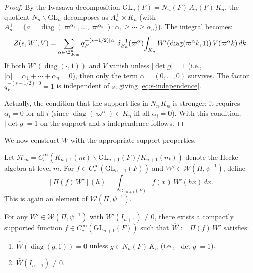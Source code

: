 \begin{proof}
By the Iwasawa decomposition $\mathrm{GL}_n(F) = N_n(F)\,A_n(F)\,K_n$, the
quotient $N_n \backslash \mathrm{GL}_n$ decomposes as $A_n^+ \times K_n$
(with $A_n^+ = \{a = \operatorname{diag}(\varpi^{\alpha_1},\ldots,\varpi^{\alpha_n})
: \alpha_1 \geq \cdots \geq \alpha_n\}$). The integral becomes:
\[
  Z(s, W', V) = \sum_{\alpha \in \Z^n_{\mathrm{dom}}}
  q_F^{-(s-1/2)|\alpha|}\,\delta_{B_n}^{-1}(\varpi^\alpha)\!
  \int_{K_n} W'(\operatorname{diag}(\varpi^\alpha k, 1))\,V(\varpi^\alpha k)\,dk.
\]
If both $W'(\operatorname{diag}(\cdot,1))$ and $V$ vanish unless $|\!\det g| = 1$
(i.e., $|\alpha| = \alpha_1 + \cdots + \alpha_n = 0$), then only the term
$\alpha = (0,\ldots,0)$ survives. The factor $q_F^{-(s-1/2) \cdot 0} = 1$
is independent of $s$, giving \eqref{eq:s-independence}.

Actually, the condition that the support lies in $N_n\,K_n$ is stronger:
it requires $\alpha_i = 0$ for all $i$ (since $\operatorname{diag}(\varpi^\alpha) \in K_n$
iff all $\alpha_i = 0$). With this condition, $|\!\det g| = 1$ on the support
and $s$-independence follows.
\end{proof}

We now construct $W$ with the appropriate support properties.

\begin{definition}\label{def:hecke}
Let $\mathcal{H}_m = C_c^\infty(K_{n+1}(m) \backslash \mathrm{GL}_{n+1}(F) / K_{n+1}(m))$
denote the Hecke algebra at level $m$. For $f \in C_c^\infty(\mathrm{GL}_{n+1}(F))$
and $W' \in \mathcal{W}(\Pi, \psi^{-1})$, define
\[
  [\Pi(f)\,W'](h) = \int_{\mathrm{GL}_{n+1}(F)} f(x)\,W'(hx)\,dx.
\]
This is again an element of $\mathcal{W}(\Pi, \psi^{-1})$.
\end{definition}

\begin{proposition}
\label{prop:support-truncation}
For any $W' \in \mathcal{W}(\Pi, \psi^{-1})$ with $W'(I_{n+1}) \neq 0$,
there exists a compactly supported function
$f \in C_c^\infty(\mathrm{GL}_{n+1}(F))$ such that
$\widehat{W} := \Pi(f)\,W'$ satisfies:
\begin{enumerate}
\item[(i)] $\widehat{W}(\operatorname{diag}(g,1)) = 0$ unless
  $g \in N_n(F)\,K_n$ (i.e., $|\!\det g| = 1$).
\item[(ii)] $\widehat{W}(I_{n+1}) \neq 0$.
\end{enumerate}
\end{proposition}

